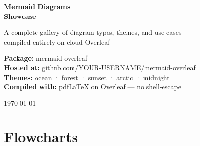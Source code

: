 \documentclass[12pt, a4paper]{article}
\begin{document}

\begin{titlepage}
  \centering
  \vspace*{3cm}

  {\fontsize{36}{42}\selectfont\sffamily\bfseries
   \textcolor{mmd-ocean-frame}{Mermaid}
   \textcolor{mmd-ocean-accent}{Diagrams}\\[0.3em]
   \textcolor{mmd-forest-frame}{Showcase}}

  \vspace{1em}
  {\large\sffamily\color{mmd-ocean-cmt}
    A complete gallery of diagram types, themes, and use-cases\\
    compiled entirely on cloud Overleaf}

  \vspace{2.5cm}

  \begin{tcolorbox}[
      enhanced,
      colback=mmd-ocean-bg,
      colframe=mmd-ocean-frame,
      boxrule=1.5pt,
      arc=8pt,
      width=0.72\textwidth,
      halign=center,
      fontupper=\sffamily,
  ]
    {\color{mmd-ocean-kw}\bfseries Package:}\enspace
    {\color{mmd-ocean-str}\ttfamily mermaid-overleaf}\\[4pt]
    {\color{mmd-ocean-kw}\bfseries Hosted at:}\enspace
    {\color{mmd-ocean-accent}\ttfamily github.com/YOUR-USERNAME/mermaid-overleaf}\\[4pt]
    {\color{mmd-ocean-kw}\bfseries Themes:}\enspace
    {\color{mmd-ocean-str}ocean · forest · sunset · arctic · midnight}\\[4pt]
    {\color{mmd-ocean-kw}\bfseries Compiled with:}\enspace
    {\color{mmd-ocean-str}pdfLaTeX on Overleaf — no shell-escape}
  \end{tcolorbox}

  \vspace{2cm}
  {\small\sffamily\color{mmd-ocean-cmt} \today}

  \vfill

  \MermaidWorkflow
\end{titlepage}

\tableofcontents
\newpage

\section{Flowcharts}
\end{document}

